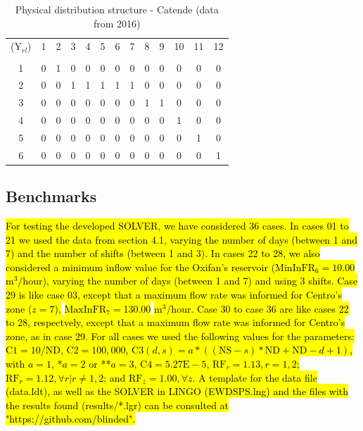 \documentclass{singlecol}
\theoremstyle{TH}{
\newtheorem{lemma}{Lemma}
\newtheorem{theorem}[lemma]{Theorem}
\newtheorem{corrolary}[lemma]{Corrolary}
\newtheorem{conjecture}[lemma]{Conjecture}
\newtheorem{proposition}[lemma]{Proposition}
\newtheorem{claim}[lemma]{Claim}
\newtheorem{stheorem}[lemma]{Wrong Theorem}
\newtheorem{algorithm}{Algorithm}
}
\theoremstyle{THrm}{
\newtheorem{definition}{Definition}[section]
\newtheorem{question}{Question}[section]
\newtheorem{remark}{Remark}
\newtheorem{scheme}{Scheme}
}
\theoremstyle{THhit}{
\newtheorem{case}{Case}[section]
}
\begin{document}
\begin{table}[H]
\begin{center}
	\begin{tabular}{ c c c c c c c c c c c c c } 

		($\mathrm{Y}_{rl}$)	& 1 & 2 & 3 & 4 & 5 & 6 & 7 & 8 & 9 & 10 & 11 & 12  \\
		                                                                      \\
		1	              	& 0 & 1 & 0 & 0 & 0 & 0 & 0 & 0 & 0 &  0 &  0 &  0  \\
		2                 	& 0 & 0 & 1 & 1 & 1 & 1 & 1 & 0 & 0 &  0 &  0 &  0  \\
		3                 	& 0 & 0 & 0 & 0 & 0 & 0 & 0 & 1 & 1 &  0 &  0 &  0  \\
		4                 	& 0 & 0 & 0 & 0 & 0 & 0 & 0 & 0 & 0 &  1 &  0 &  0  \\
		5                 	& 0 & 0 & 0 & 0 & 0 & 0 & 0 & 0 & 0 &  0 &  1 &  0  \\
	    6                 	& 0 & 0 & 0 & 0 & 0 & 0 & 0 & 0 & 0 &  0 &  0 &  1  \\
	\end{tabular}
\caption{Physical distribution structure - Catende (data from 2016)}
\label{tab:phyDitStr}
\end{center}
\end{table}

\subsection{Benchmarks}
\label{sec:benchmarks}

\hl{For testing the developed SOLVER, we have considered 36 cases. In cases 01 to 21 we used the data from section 4.1, varying the number of days (between 1 and 7) and the number of shifts (between 1 and 3). In cases 22 to 28, we also considered a minimum inflow value for the Oxifan's reservoir ($\mathrm{MinInFR}_6 = 10.00$ m$^3$/hour), varying the number of days (between 1 and 7) and using 3 shifts. Case 29 is like case 03, except that a maximum flow rate was informed for Centro's zone ($z = 7$),} \hl{$\mathrm{MaxInFR}_7 = $130.00} \hl{$\mathrm{m^3}$/hour. Case 30 to case 36 are like cases 22 to 28, respectvely, except that a maximum flow rate was informed for Centro's zone, as in case 29. For all cases we used the following values for the parameters: $\mathrm{C1}= 10/\mathrm{ND}$, $\mathrm{C2}= 100,000$, $\mathrm{C3}(d,s)=a*((\mathrm{NS}-s)*\mathrm{ND} + \mathrm{ND} - d + 1)$, with $a=1$, *$a=2$ or **$a=3$, $\mathrm{C4} = 5.27\mathrm{E-}5$, $\mathrm{RF}_r = 1.13, r=1,2$;  $\mathrm{RF}_r = 1.12,  \forall r | r \neq 1,2$; and $\mathrm{RF}_z =1.00, \forall z$. A template for the data file (data.ldt), as well as the SOLVER in LINGO (EWDSPS.lng) and the files with the results found (results/*.lgr) can be consulted at "https://github.com/blinded".}
\end{document}
